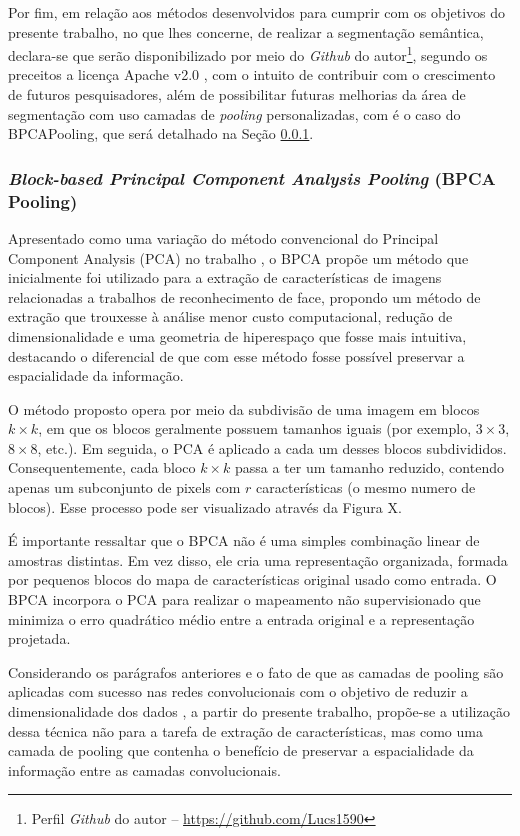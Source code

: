 Por fim, em relação aos métodos desenvolvidos para cumprir com os objetivos do presente trabalho, no que lhes concerne, de realizar a segmentação semântica, declara-se que serão disponibilizado por meio do \textit{Github} do autor\footnote{Perfil \textit{Github} do autor – \url{https://github.com/Lucs1590}}, segundo os preceitos a licença Apache v2.0 \citep{Licenses}, com o intuito de contribuir com o crescimento de futuros pesquisadores, além de possibilitar futuras melhorias da área de segmentação com uso camadas de \textit{pooling} personalizadas, com é o caso do BPCAPooling, que será detalhado na Seção \ref{project:bpca}.


\subsubsection{\textit{Block-based Principal Component Analysis Pooling} (BPCA Pooling)}
\label{project:bpca}

Apresentado como uma variação do método convencional do Principal Component Analysis (PCA) no trabalho \cite{Salvadeo2011}, o BPCA propõe um método que inicialmente foi utilizado para a extração de características de imagens relacionadas a trabalhos de reconhecimento de face, propondo um método de extração que trouxesse à análise menor custo computacional, redução de dimensionalidade e uma geometria de hiperespaço que fosse mais intuitiva, destacando o diferencial de que com esse método fosse possível preservar a espacialidade da informação.

O método proposto opera por meio da subdivisão de uma imagem em blocos $k \times k$, em que os blocos geralmente possuem tamanhos iguais (por exemplo, $3 \times 3$, $8 \times 8$, etc.). Em seguida, o PCA é aplicado a cada um desses blocos subdivididos. Consequentemente, cada bloco $k \times k$ passa a ter um tamanho reduzido, contendo apenas um subconjunto de pixels com $r$ características (o mesmo numero de blocos). Esse processo pode ser visualizado através da Figura X.

É importante ressaltar que o BPCA não é uma simples combinação linear de amostras distintas. Em vez disso, ele cria uma representação organizada, formada por pequenos blocos do mapa de características original usado como entrada. O BPCA incorpora o PCA para realizar o mapeamento não supervisionado que minimiza o erro quadrático médio entre a entrada original e a representação projetada.

Considerando os parágrafos anteriores e o fato de que as camadas de pooling são aplicadas com sucesso nas redes convolucionais com o objetivo de reduzir a dimensionalidade dos dados \cite{Paul2019DimensionalityPooling}, a partir do presente trabalho, propõe-se a utilização dessa técnica não para a tarefa de extração de características, mas como uma camada de pooling que contenha o benefício de preservar a espacialidade da informação entre as camadas convolucionais.

